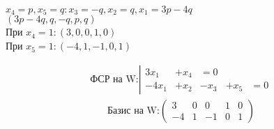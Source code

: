 \documentclass{article}
\begin{document}
\begin{center}
    $x_4=p, x_5=q: x_3=-q, x_2=q, x_1=3p-4q$ \\
    $(3p-4q,q,-q,p,q)$\\
    При $x_4=1:(3,0,0,1,0)$\\
    При $x_5=1:(-4,1,-1,0,1)$\\
\end{center}
\begin{align}\label{fsrW}
    \text{ФСР на W:}
    \left|\begin{array}{ccccc}
              3x_1  & +x_4 & =0               \\
              -4x_1 & +x_2 & -x_3 & +x_5 & =0
          \end{array}\right.
\end{align}
\begin{align}\label{bazisW}
    \text{Базис на W:}
    \left(\begin{array}{ccccc}
                  3  & 0 & 0  & 1 & 0 \\
                  -4 & 1 & -1 & 0 & 1
              \end{array}\right)
\end{align}
\end{document}
